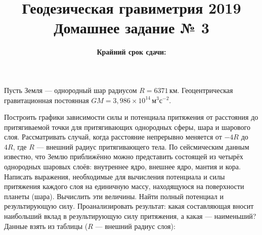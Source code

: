 \documentclass[11pt, a4paper,addpoints]{exam}
\title{{\Large Геодезическая гравиметрия 2019}\\ 
    {\bf\Large Домашнее задание № 3}}
\author{}
\date{\normalsize\bf Крайний срок сдачи: \DTMusedate{deadline}}
\theoremstyle{remark}
\begin{document}
\maketitle
\thispagestyle{empty}
\begin{questions}
    \question[1] Пусть Земля --- однородный шар радиусом $R = 6371\,\text{км}$. Геоцентрическая
    гравитационная постоянная $GM = 3,986\times10^{14}\,\text{м}^3\text{с}^{-2}$.
    \question[1] Построить графики зависимости силы и потенциала притяжения от расстояния до
    притягиваемой точки для притягивающих однородных сферы, шара и шарового слоя. Рассматривать случай, когда расстояние непрерывно меняется от $-4R$ до $4R$, где $R$ --- внешний радиус притягивающего тела.
    \question[1] По сейсмическим данным известно, что Землю приближённо можно представить состоящей 
    из четырёх однородных шаровых слоёв: внутреннее ядро, внешнее ядро, мантия и кора. 
    Написать выражения, необходимые для 
    вычисления потенциала и силы притяжения каждого слоя на единичную массу, находящуюся на поверхности планеты (шара). Вычислить эти величины. Найти полный потенциал и результирующую силу. Проанализировать результат: какая составляющая вносит наибольший вклад в результирующую силу притяжения, а какая --- наименьший? Данные взять из таблицы ($R$ --- внешний радиус слоя):

\end{questions}
\end{document}

